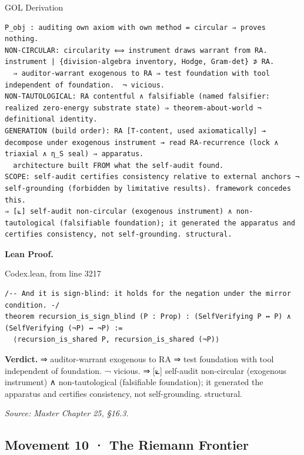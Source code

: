 \documentclass[10pt,twocolumn]{article}
\begin{document}
\begin{golbox}{GOL Derivation}
\begin{lstlisting}[style=golv]
P_obj : auditing own axiom with own method = circular ⇒ proves nothing.
NON-CIRCULAR: circularity ⟺ instrument draws warrant from RA. instrument | {division-algebra inventory, Hodge, Gram-det} ⊅ RA.
  ⇒ auditor-warrant exogenous to RA ⇒ test foundation with tool independent of foundation.  ¬ vicious.
NON-TAUTOLOGICAL: RA contentful ∧ falsifiable (named falsifier: realized zero-energy substrate state) ⇒ theorem-about-world ¬ definitional identity.
GENERATION (build order): RA [T-content, used axiomatically] → decompose under exogenous instrument → read RA-recurrence (lock ∧ triaxial ∧ η_S seal) ⇒ apparatus.
  architecture built FROM what the self-audit found.
SCOPE: self-audit certifies consistency relative to external anchors ¬ self-grounding (forbidden by limitative results). framework concedes this.
⇒ [⟀] self-audit non-circular (exogenous instrument) ∧ non-tautological (falsifiable foundation); it generated the apparatus and certifies consistency, not self-grounding. structural.
\end{lstlisting}
\end{golbox}

\textbf{Lean Proof.}

\begin{leanexcerpt}{Codex.lean, from line 3217}
\begin{lstlisting}[style=leanx,firstnumber=3217]
/-- And it is sign-blind: it holds for the negation under the mirror condition. -/
theorem recursion_is_sign_blind (P : Prop) : (SelfVerifying P ↔ P) ∧ (SelfVerifying (¬P) ↔ ¬P) :=
  ⟨recursion_is_shared P, recursion_is_shared (¬P)⟩
\end{lstlisting}
\end{leanexcerpt}

\textbf{Verdict.} ⇒ auditor-warrant exogenous to RA ⇒ test foundation
with tool independent of foundation. ¬ vicious. ⇒ {[}⟀{]} self-audit
non-circular (exogenous instrument) ∧ non-tautological (falsifiable
foundation); it generated the apparatus and certifies consistency, not
self-grounding. structural.

\emph{Source: Master Chapter 25, §16.3.}

\hypertarget{movement-10-the-riemann-frontier}{%
\subsection{Movement 10 · The Riemann
Frontier}\label{movement-10-the-riemann-frontier}}
\end{document}
